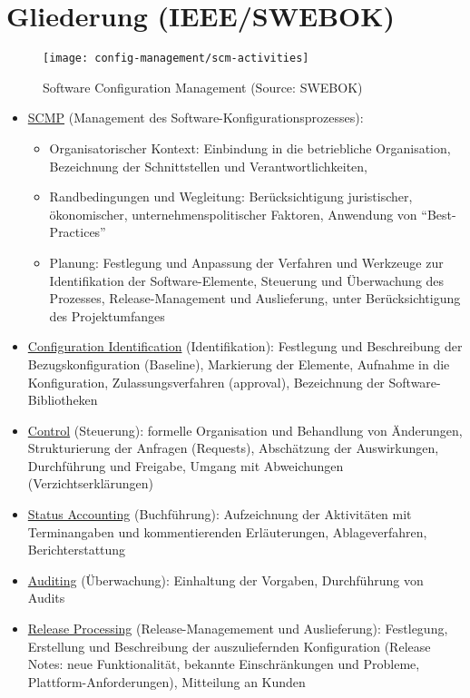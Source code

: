 \section{Gliederung (IEEE/SWEBOK)}
\begin{figure}[H]
\centering
\texttt{[image: config-management/scm-activities]}
\caption{Software Configuration Management (Source: SWEBOK)}
\end{figure}
\begin{itemize}
\item \underline{SCMP}
   (Management des Software-Konfigurationsprozesses):
  \begin{itemize}
  \item Organisatorischer Kontext: Einbindung in die betriebliche
  Organisation, Bezeichnung der Schnittstellen und Verantwortlichkeiten,
\item Randbedingungen und Wegleitung: Berücksichtigung juristischer,
  ökonomischer, unternehmenspolitischer Faktoren, Anwendung von
  ``Best-Practices''
\item Planung: Festlegung und Anpassung der Verfahren und Werkzeuge zur
  Identifikation der Software-Elemente, Steuerung und Überwachung des
  Prozesses, Release-Management und Auslieferung, unter Berücksichtigung des
  Projektumfanges
  \end{itemize}
\item \underline{Configuration Identification} (Identifikation):
 Festlegung und Beschreibung der Bezugskonfiguration (Baseline),
  Markierung der Elemente, Aufnahme in die Konfiguration,
  Zulassungsverfahren (approval), Bezeichnung der Software-Bibliotheken
\item \underline{Control} (Steuerung):
  formelle Organisation und Behandlung von Änderungen,
  Strukturierung der Anfragen (Requests), Abschätzung der Auswirkungen,
  Durchführung und Freigabe, Umgang mit Abweichungen (Verzichtserklärungen)
\item \underline{Status Accounting} (Buchführung): Aufzeichnung der Aktivitäten mit
  Terminangaben und
  kommentierenden Erläuterungen, Ablageverfahren, Berichterstattung
\item \underline{Auditing} (Überwachung): Einhaltung der Vorgaben,
  Durchführung von Audits
\item \underline{Release Processing} (Release-Managemement und Auslieferung):
  Festlegung,
  Erstellung und
  Beschreibung der auszuliefernden Konfiguration (Release Notes: neue
  Funktionalität, bekannte
  Einschränkungen und Probleme, Plattform-Anforderungen), Mitteilung an Kunden
\end{itemize}
